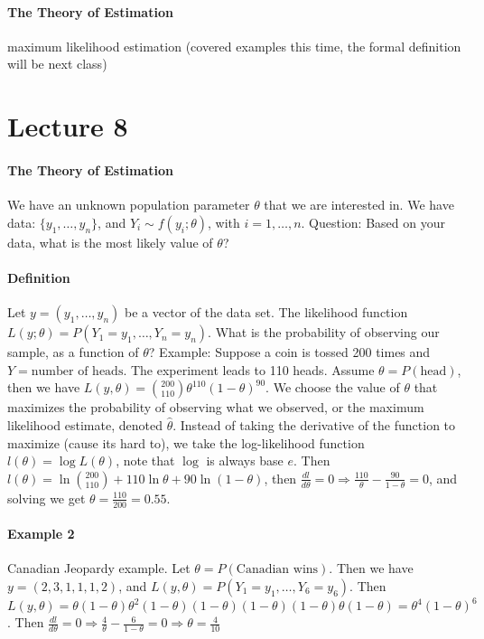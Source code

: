 \documentclass[10pt,letter]{article}
\theoremstyle{plain}
\theoremstyle{definition}
\begin{document}
\paragraph{The Theory of Estimation}
maximum likelihood estimation (covered examples this time, the formal definition will be next class)

\section*{Lecture 8}
\paragraph{The Theory of Estimation}
We have an unknown population parameter $\theta$ that we are interested in. We have data: $\{y_1,\ldots,y_n\}$, and $Y_i\sim f(y_i;\theta)$, with $i=1,\ldots,n$. Question: Based on your data, what is the most likely value of $\theta$? 
\paragraph{Definition}
Let $y=(y_1,\ldots,y_n)$ be a vector of the data set. The likelihood function $L(y;\theta)=P(Y_1=y_1,\ldots,Y_n=y_n)$. What is the probability of observing our sample, as a function of $\theta$? Example: Suppose a coin is tossed 200 times and $Y=\text{number of heads}$. The experiment leads to 110 heads. Assume $\theta=P(\text{head})$, then we have $L(y,\theta)=\binom{200}{110}\theta^{110}(1-\theta)^{90}$. We choose the value of $\theta$ that maximizes the probability of observing what we observed, or the maximum likelihood estimate, denoted $\hat{\theta}$. Instead of taking the derivative of the function to maximize (cause its hard to), we take the log-likelihood function $l(\theta)=\log L(\theta)$, note that $\log$ is always base $e$. Then $l(\theta)=\ln\binom{200}{110}+110\ln\theta+90\ln(1-\theta)$, then $\frac{dl}{d\theta}=0\Rightarrow \frac{110}{\theta}-\frac{90}{1-\theta}=0$, and solving we get $\theta=\frac{110}{200}=0.55$. 
\paragraph{Example 2}
Canadian Jeopardy example. Let $\theta=P(\text{Canadian wins})$. Then we have $y=(2,3,1,1,1,2)$, and $L(y,\theta)=P(Y_1=y_1,\ldots,Y_6=y_6)$. Then $L(y,\theta)=\theta(1-\theta)\theta^2(1-\theta)(1-\theta)(1-\theta)(1-\theta)\theta(1-\theta)=\theta^4(1-\theta)^6$. Then $\frac{dl}{d\theta}=0\Rightarrow \frac{4}{\theta}-\frac{6}{1-\theta}=0\Rightarrow \theta=\frac{4}{10}$ 
\end{document}
